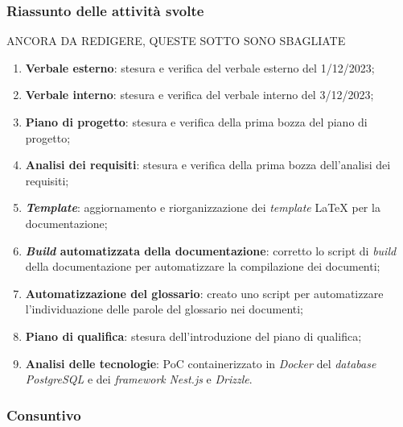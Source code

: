 \subsubsection{Riassunto delle attività svolte}
ANCORA DA REDIGERE, QUESTE SOTTO SONO SBAGLIATE
\begin{enumerate}
	\item \textbf{Verbale esterno}: stesura e verifica del verbale esterno del
	      1/12/2023;

	\item \textbf{Verbale interno}: stesura e verifica del verbale interno del
	      3/12/2023;

	\item \textbf{Piano di progetto}: stesura e verifica della prima bozza del
	      piano di progetto;

	\item \textbf{Analisi dei requisiti}: stesura e verifica della prima bozza
	      dell'analisi dei requisiti;

	\item \textbf{\textit{Template}}: aggiornamento e riorganizzazione dei
	      \textit{template} LaTeX per la documentazione;

	\item \textbf{\textit{Build} automatizzata della documentazione}:
	      corretto lo script di \textit{build} della documentazione per
	      automatizzare la compilazione dei documenti;

	\item \textbf{Automatizzazione del glossario}: creato uno script per
	      automatizzare l'individuazione delle parole del glossario nei
	      documenti;

	\item \textbf{Piano di qualifica}: stesura dell'introduzione del piano
	      di qualifica;

	\item \textbf{Analisi delle tecnologie}: PoC containerizzato in
	      \textit{Docker} del \textit{database} \textit{PostgreSQL} e dei
	      \textit{framework} \textit{Nest.js} e \textit{Drizzle}.
\end{enumerate}

\subsubsection{Consuntivo}

